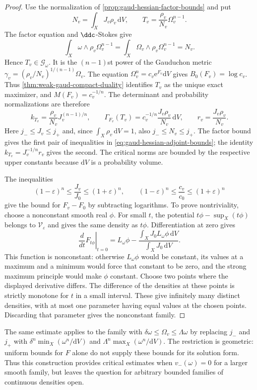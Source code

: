 \begin{proof}
Use the normalization of \cref{prop:gaud-hessian-factor-bounds} and put
\[
 N_v=\int_XJ_v\rho_v\,\mathrm{d}V,
 \qquad T_v=\frac{\rho_v}{N_v}\Omega_v^{n-1}.
\]
The factor equation and $\ddc$-Stokes give
\[
 \int_X\omega\wedge\rho_v\Omega_v^{n-1}
   =\int_X\Omega_v\wedge\rho_v\Omega_v^{n-1}=N_v.
\]
Hence $T_v\in\mathscr G_\omega$. It is the $(n-1)$st power of the Gauduchon metric $\gamma_v=(\rho_v/N_v)^{1/(n-1)}\Omega_v$. The equation $\Omega_v^n=c_v\mathrm e^{F_v}\mathrm{d}V$ gives $B_0(F_v)=\log c_v$. Thus \cref{thm:weak-gaud-compact-duality} identifies $T_v$ as the unique exact maximizer, and $M(F_v)=c_v^{-1/n}$. The determinant and probability normalizations are therefore
\begin{equation}\label{eq:gaud-hessian-adjoint-densities}
 k_{T_v}=\frac{\rho_v}{N_v}J_v^{(n-1)/n},
 \qquad
 \Gamma_{F_v}(T_v)=c_v^{-1/n}\frac{J_v\rho_v}{N_v}\,\mathrm{d}V,
 \qquad r_v=\frac{J_v\rho_v}{N_v}.
\end{equation}
Here $j_-\leq J_v\leq j_+$ and, since $\int_X\rho_v\,\mathrm{d}V=1$, also $j_-\leq N_v\leq j_+$. The factor bound gives the first pair of inequalities in \eqref{eq:gaud-hessian-adjoint-bounds}; the identity $k_{T_v}=J_v^{-1/n}r_v$ gives the second. The critical norms are bounded by the respective upper constants because $\mathrm{d}V$ is a probability volume.

The inequalities
\[
 (1-\varepsilon)^n\leq\frac{J_v}{J_0}\leq(1+\varepsilon)^n,
 \qquad
 (1-\varepsilon)^n\leq\frac{c_v}{c_0}\leq(1+\varepsilon)^n
\]
give the bound for $F_v-F_0$ by subtracting logarithms. To prove nontriviality, choose a nonconstant smooth real $\phi$. For small $t$, the potential $t\phi-\sup_X(t\phi)$ belongs to $\mathcal V_\varepsilon$ and gives the same density as $t\phi$. Differentiation at zero gives
\[
 \left.\frac{d}{dt}F_{t\phi}\right|_{t=0}
 =L_\omega\phi-
       \frac{\int_XJ_0L_\omega\phi\,\mathrm{d}V}{\int_XJ_0\,\mathrm{d}V}.
\]
This function is nonconstant: otherwise $L_\omega\phi$ would be constant, its values at a maximum and a minimum would force that constant to be zero, and the strong maximum principle would make $\phi$ constant. Choose two points where the displayed derivative differs. The difference of the densities at these points is strictly monotone for $t$ in a small interval. These give infinitely many distinct densities, with at most one parameter having equal values at the chosen points. Discarding that parameter gives the nonconstant family.
\end{proof}

The same estimate applies to the family with $\delta\omega\leq\Omega_v\leq\Lambda\omega$ by replacing $j_-$ and $j_+$ with $\delta^n\min_X(\omega^n/\mathrm{d}V)$ and $\Lambda^n\max_X(\omega^n/\mathrm{d}V)$. The restriction is geometric: uniform bounds for $F$ alone do not supply these bounds for its solution form. Thus this construction provides critical estimates when $v_-(\omega)=0$ for a larger smooth family, but leaves the question for arbitrary bounded families of continuous densities open.
